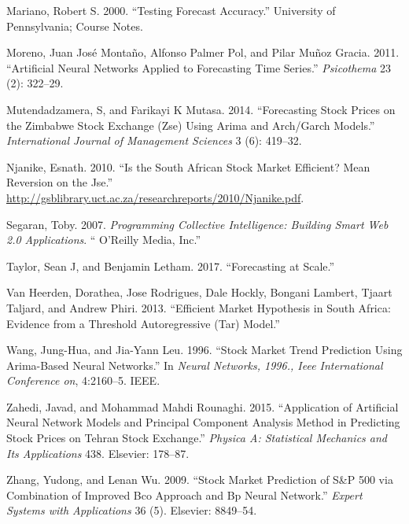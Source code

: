 \documentclass[12pt,preprint, authoryear]{elsarticle}
\numberwithin{equation}{section}
\numberwithin{figure}{section}
\numberwithin{table}{section}
\begin{document}
\hypertarget{ref-Mariano2000}{}
Mariano, Robert S. 2000. ``Testing Forecast Accuracy.'' University of
Pennsylvania; Course Notes.

\hypertarget{ref-moreno2011artificial}{}
Moreno, Juan José Montaño, Alfonso Palmer Pol, and Pilar Muñoz Gracia.
2011. ``Artificial Neural Networks Applied to Forecasting Time Series.''
\emph{Psicothema} 23 (2): 322--29.

\hypertarget{ref-Muten2014}{}
Mutendadzamera, S, and Farikayi K Mutasa. 2014. ``Forecasting Stock
Prices on the Zimbabwe Stock Exchange (Zse) Using Arima and Arch/Garch
Models.'' \emph{International Journal of Management Sciences} 3 (6):
419--32.

\hypertarget{ref-Njanike2010}{}
Njanike, Esnath. 2010. ``Is the South African Stock Market Efficient?
Mean Reversion on the Jse.''
\url{http://gsblibrary.uct.ac.za/researchreports/2010/Njanike.pdf}.

\hypertarget{ref-segaran2007programming}{}
Segaran, Toby. 2007. \emph{Programming Collective Intelligence: Building
Smart Web 2.0 Applications}. `` O'Reilly Media, Inc.''

\hypertarget{ref-taylor2017forecasting}{}
Taylor, Sean J, and Benjamin Letham. 2017. ``Forecasting at Scale.''

\hypertarget{ref-van2013efficient}{}
Van Heerden, Dorathea, Jose Rodrigues, Dale Hockly, Bongani Lambert,
Tjaart Taljard, and Andrew Phiri. 2013. ``Efficient Market Hypothesis in
South Africa: Evidence from a Threshold Autoregressive (Tar) Model.''

\hypertarget{ref-wang1996stock}{}
Wang, Jung-Hua, and Jia-Yann Leu. 1996. ``Stock Market Trend Prediction
Using Arima-Based Neural Networks.'' In \emph{Neural Networks, 1996.,
Ieee International Conference on}, 4:2160--5. IEEE.

\hypertarget{ref-zahedi2015application}{}
Zahedi, Javad, and Mohammad Mahdi Rounaghi. 2015. ``Application of
Artificial Neural Network Models and Principal Component Analysis Method
in Predicting Stock Prices on Tehran Stock Exchange.'' \emph{Physica A:
Statistical Mechanics and Its Applications} 438. Elsevier: 178--87.

\hypertarget{ref-zhang2009stock}{}
Zhang, Yudong, and Lenan Wu. 2009. ``Stock Market Prediction of S\&P 500
via Combination of Improved Bco Approach and Bp Neural Network.''
\emph{Expert Systems with Applications} 36 (5). Elsevier: 8849--54.

\newpage
\nocite{*}

\end{document}

